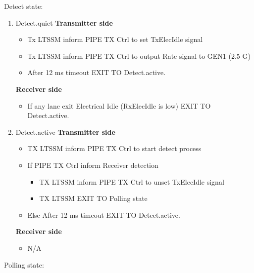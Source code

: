 Detect state: \newline 
\begin{enumerate}
  \item Detect.quiet 
 \newline \textbf{Transmitter side}
  \begin{itemize}
    \item Tx LTSSM inform PIPE TX Ctrl to set TxElecIdle signal 
    \item Tx LTSSM inform PIPE TX Ctrl to output Rate signal to GEN1 (2.5 G) 
    \item After 12 ms timeout EXIT TO Detect.active.
  \end{itemize}
    \textbf{Receiver side}
\begin{itemize}
  
  \item If any lane exit Electrical Idle
   (RxElecIdle is low) EXIT TO Detect.active.
\end{itemize}
  \item Detect.active
 \textbf{Transmitter side}  
 \begin{itemize}
   \item  TX LTSSM inform PIPE TX Ctrl to start detect process
  \item   If  PIPE TX Ctrl inform Receiver detection 
\begin{itemize}
  \item TX LTSSM inform PIPE TX Ctrl to unset TxElecIdle signal 
  \item TX LTSSM EXIT TO Polling state
\end{itemize}
\item Else After 12 ms timeout EXIT TO Detect.active.

 \end{itemize}
        
\textbf{Receiver side}  
\begin{itemize}
  \item N/A
\end{itemize}    

\end{enumerate}
Polling state: \newline 

